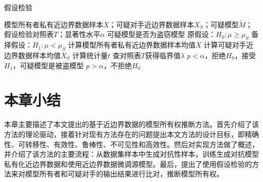 \begin{algorithm}[h] 
	\caption{假设检验}
	\label{alg:4}
	\begin{algorithmic}[1]
		
		\Require 模型所有者私有近边界数据样本$X$；可疑对手近边界数据样本$X_S$；可疑模型$\tilde{M}$；假设检验对照表$T$；显著性水平$\alpha$
		\Ensure 可疑模型是否为盗窃模型
		\State 原假设：$H_0:\mu \geq \mu_S$
		\State 备择假设：$H_1:\mu < \mu_S$
		\State 计算模型所有者私有近边界数据样本均值$\overline{X}$                     
		\State 计算可疑对手近边界数据样本均值$\overline{X}_S$ 
		\State 计算统计量$t$
		\State 查对照表$T$获得临界值$\lambda$
		\State $p < \alpha$，拒绝$H_0$，接受$H_1$，可疑模型是被盗模型
		\Else \State $p > \alpha$，不拒绝$H_0$
		\EndIf
	\end{algorithmic}
\end{algorithm}

\section{本章小结}

本章主要描述了本文提出的基于近边界数据的模型所有权推断方法。首先介绍了该方法的理论驱动，接着针对现有方法存在的问题提出本文方法的设计目标，即精确性、可转移性、有效性、鲁棒性、不可见性和高效性。然后对实现方法做了概述，并介绍了该方法的主要流程：从数据集样本中生成对抗性样本，训练生成对抗模型私有化近边界数据和使用近边界数据微调源模型。最后，提出了使用假设检验的方法来对模型所有者和可疑对手的输出结果进行比对，推断模型所有权。
